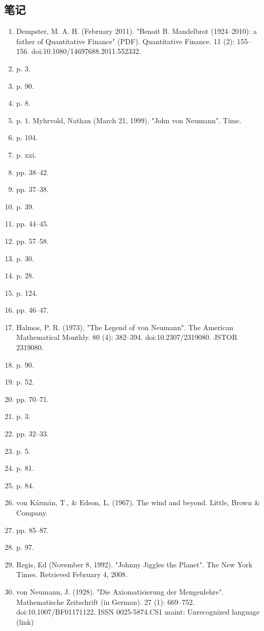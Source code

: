 \subsection{笔记}
\begin{enumerate}
\item Dempster, M. A. H. (February 2011). "Benoit B. Mandelbrot (1924–2010): a father of Quantitative Finance" (PDF). Quantitative Finance. 11 (2): 155–156. doi:10.1080/14697688.2011.552332.
\item p. 3.
\item p. 90.
\item p. 8.
\item p. 1.
Myhrvold, Nathan (March 21, 1999). "John von Neumann". Time.
\item p. 104.
\item p. xxi.
\item pp. 38–42.
\item pp. 37–38.
\item p. 39.
\item pp. 44–45.
\item pp. 57–58.
\item p. 30.
\item p. 28.
\item p. 124.
\item pp. 46–47.
\item Halmos, P. R. (1973). "The Legend of von Neumann". The American Mathematical Monthly. 80 (4): 382–394. doi:10.2307/2319080. JSTOR 2319080.
\item  p. 90.
\item p. 52.
\item  pp. 70–71.
\item  p. 3.
\item  pp. 32–33.
\item p. 5.
\item  p. 81.
\item  p. 84.
\item von Kármán, T., & Edson, L. (1967). The wind and beyond. Little, Brown & Company.
\item  pp. 85–87.
\item  p. 97.
\item Regis, Ed (November 8, 1992). "Johnny Jiggles the Planet". The New York Times. Retrieved February 4, 2008.
\item von Neumann, J. (1928). "Die Axiomatisierung der Mengenlehre". Mathematische Zeitschrift (in German). 27 (1): 669–752. doi:10.1007/BF01171122. ISSN 0025-5874.CS1 maint: Unrecognized language (link)

\end{enumerate}
